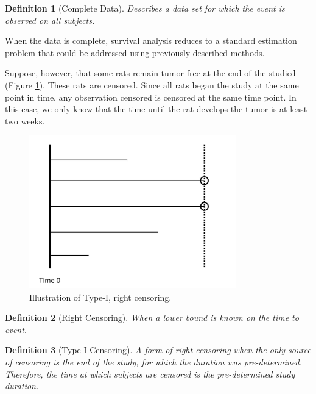 \documentclass[
]{book}
\theoremstyle{plain}
\theoremstyle{mydefn}
\newtheorem{definition}{Definition}[chapter]
\theoremstyle{myexmpl}
\theoremstyle{remark}
\begin{document}
\begin{definition}[Complete Data]
Describes a data set for which the event is observed on all subjects.
\end{definition}

When the data is complete, survival analysis reduces to a standard estimation problem that could be addressed using previously described methods.

Suppose, however, that some rats remain tumor-free at the end of the studied (Figure \ref{fig:surv-censoring-type-1}). These rats are censored. Since all rats began the study at the same point in time, any observation censored is censored at the same time point. In this case, we only know that the time until the rat develops the tumor is at least two weeks.

\begin{figure}

{\centering \includegraphics[width=0.8\textwidth]{images/censoring-type-1} 

}

\caption{Illustration of Type-I, right censoring.}\label{fig:surv-censoring-type-1}
\end{figure}

\begin{definition}[Right Censoring]
When a \emph{lower} bound is known on the time to event.
\end{definition}

\begin{definition}[Type I Censoring]
A form of right-censoring when the only source of censoring is the end of the study, for which the duration was pre-determined. Therefore, the time at which subjects are censored is the pre-determined study duration.
\end{definition}
\end{document}
